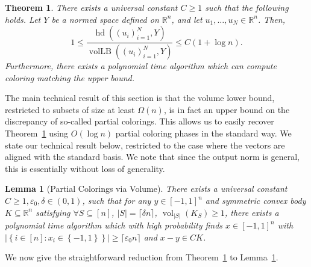 \documentclass[12pt]{article}
\newtheorem{theorem}{Theorem}
\newtheorem{lemma}{Lemma}
\newcommand{\ceil}[1]{\lceil #1 \rceil}
\newcommand{\R}{{\mathbb{R}}}
\newcommand\eps{\varepsilon}
\newcommand{\set}[1]{\left\{ #1 \right\}}
\DeclareMathOperator{\vollb}{volLB}
\DeclareMathOperator{\hd}{hd}
\DeclareMathOperator{\vol}{vol}
\begin{document}
\begin{theorem}\label{thm:tightness}
There exists a universal constant $C \geq 1$ such that the following
holds. Let $Y$ be a normed space defined on $\R^n$, and let $u_1,
\ldots, u_N \in \R^n$. Then,
\[
1 \le \frac{\hd((u_i)_{i = 1}^N, Y)}{\vollb((u_i)_{i = 1}^N, Y) } \le C(1+\log n).
\]
Furthermore, there exists a polynomial time algorithm which can compute coloring
matching the upper bound. 
\end{theorem}

The main technical result of this section is that the volume lower bound,
restricted to subsets of size at least $\Omega(n)$, is in fact an upper bound on
the discrepancy of so-called partial colorings. This allows us to easily recover
Theorem~\ref{thm:tightness} using $O(\log n)$ partial coloring phases in the
standard way. We state our technical result below, restricted to the case where
the vectors are aligned with the standard basis. We note that since the output
norm is general, this is essentially without loss of generality. 

\begin{lemma}[Partial Colorings via Volume] \label{lem:partial-via-volume}
There exists a universal constant $C \geq 1, \eps_0, \delta \in (0,1)$, such that
for any $y \in [-1,1]^n$ and symmetric convex body $K \subseteq \R^n$ satisfying
$\forall S \subseteq [n]$, $|S| = \ceil{\delta n}$, $\vol_{|S|}(K_S) \geq 1$, there
exists a polynomial time algorithm which with high probability finds $x \in
[-1,1]^n$ with $|\set{i \in [n]: x_i \in \set{-1,1}}| \geq \ceil{\eps_0 n}$ and
$x-y \in C K$.  
\end{lemma}

We now give the straightforward reduction from Theorem~\ref{thm:tightness} to
Lemma~\ref{lem:partial-via-volume}.
\end{document}
